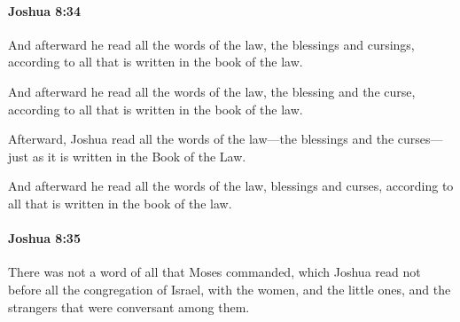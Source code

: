 		\paragraph{Joshua 8:34} %
			\label{JOSHUA-8-34}

			And afterward he read all the words of the law, the blessings and cursings, according to all that is written in the book of the law.

			\begin{versebox}
					\item[BHS] 
					\item[ASV] And afterward he read all the words of the law, the blessing and the curse, according to all that is written in the book of the law.
					\item[NIV] Afterward, Joshua read all the words of the law—the blessings and the curses—just as it is written in the Book of the Law.
					\item[NRSV] And afterward he read all the words of the law, blessings and curses, according to all that is written in the book of the law.
			\end{versebox}

		\paragraph{Joshua 8:35} %
			\label{JOSHUA-8-35}

			There was not a word of all that Moses commanded, which Joshua read not before all the congregation of Israel, with the women, and the little ones, and the strangers that were conversant among them.

